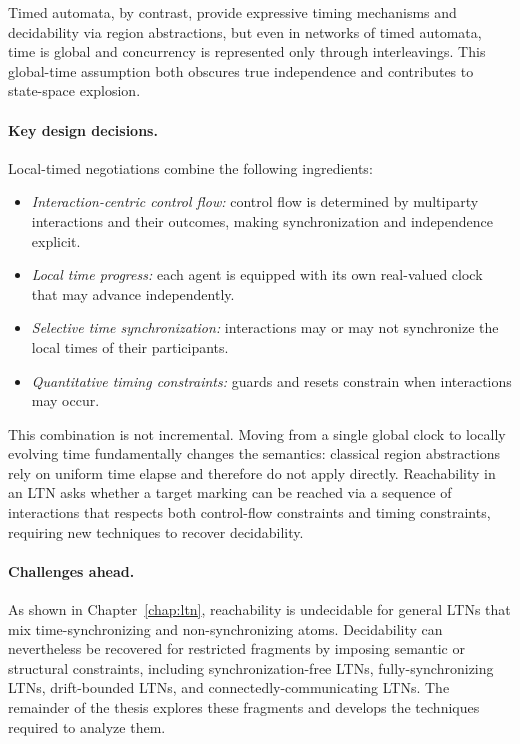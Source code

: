 Timed automata, by contrast, provide expressive timing mechanisms and decidability via
region abstractions, but even in networks of timed automata, time is global and
concurrency is represented only through interleavings. This global-time assumption
both obscures true independence and contributes to state-space explosion.

\paragraph{Key design decisions.}
Local-timed negotiations combine the following ingredients:
\begin{itemize}
\item \emph{Interaction-centric control flow:} control flow is determined by
      multiparty interactions and their outcomes, making synchronization and
      independence explicit.
\item \emph{Local time progress:} each agent is equipped with its own real-valued
      clock that may advance independently.
\item \emph{Selective time synchronization:} interactions may or may not synchronize
      the local times of their participants.
\item \emph{Quantitative timing constraints:} guards and resets constrain when
      interactions may occur.
\end{itemize}

This combination is not incremental. Moving from a single global clock to locally
evolving time fundamentally changes the semantics: classical region abstractions rely
on uniform time elapse and therefore do not apply directly. Reachability in an LTN asks
whether a target marking can be reached via a sequence of interactions that respects
both control-flow constraints and timing constraints, requiring new techniques to
recover decidability.

\paragraph{Challenges ahead.}
As shown in Chapter~\ref{chap:ltn}, reachability is undecidable for general LTNs that
mix time-synchronizing and non-synchronizing atoms. Decidability can nevertheless be
recovered for restricted fragments by imposing semantic or structural constraints,
including synchronization-free LTNs, fully-synchronizing LTNs, drift-bounded LTNs, and
connectedly-communicating LTNs. The remainder of the thesis explores these fragments
and develops the techniques required to analyze them.

